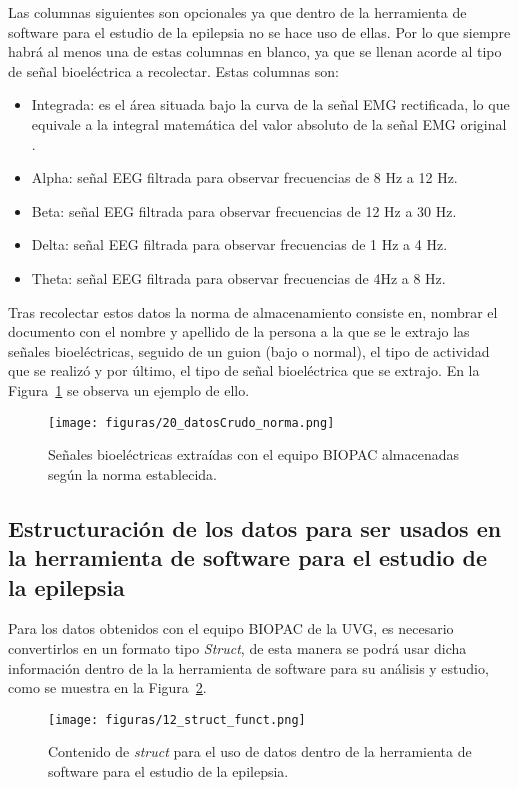 Las columnas siguientes son opcionales ya que dentro de la herramienta de software para el estudio de la epilepsia no se hace uso de ellas. Por lo que siempre habrá al menos una de estas columnas en blanco, ya que se llenan acorde al tipo de señal bioeléctrica a recolectar. Estas columnas son:
\begin{itemize}
    \item Integrada: es el área situada bajo la curva de la señal EMG rectificada, lo que equivale a la integral matemática del valor absoluto de la señal EMG original \cite{BIOPAC}.
    \item Alpha: señal EEG filtrada para observar frecuencias de 8 Hz a 12 Hz.
    \item Beta: señal EEG filtrada para observar frecuencias de 12 Hz a 30 Hz.
    \item Delta: señal EEG filtrada para observar frecuencias de 1 Hz a 4 Hz.
    \item Theta: señal EEG filtrada para observar frecuencias de 4Hz a 8 Hz.
\end{itemize}


Tras recolectar estos datos la norma de almacenamiento consiste en, nombrar el documento con el nombre y apellido de la persona a la que se le extrajo las señales bioeléctricas, seguido de un guion (bajo o normal), el tipo de actividad que se realizó y por último, el tipo de señal bioeléctrica que se extrajo. En la Figura~\ref{fig:dataCruda_almacenada} se observa un ejemplo de ello.

\begin{figure}[H]
    \centering
    \texttt{[image: figuras/20\_datosCrudo\_norma.png]}
    \caption{Señales bioeléctricas extraídas con el equipo BIOPAC almacenadas según la norma establecida.}
    \label{fig:dataCruda_almacenada}
\end{figure}

\subsection{Estructuración de los datos para ser usados en la herramienta de software para el estudio de la epilepsia}
Para los datos obtenidos con el equipo BIOPAC de la UVG, es necesario convertirlos en un formato tipo \textit{Struct}, de esta manera se podrá usar dicha información dentro de la la herramienta de software para su análisis y estudio, como se muestra en la Figura~\ref{fig:struc_func}. 

\begin{figure}[H]
    \centering
    \texttt{[image: figuras/12\_struct\_funct.png]}
    \caption{Contenido de \textit{struct} para el uso de datos dentro de la herramienta de software para el estudio de la epilepsia.}
    \label{fig:struc_func}
\end{figure}

